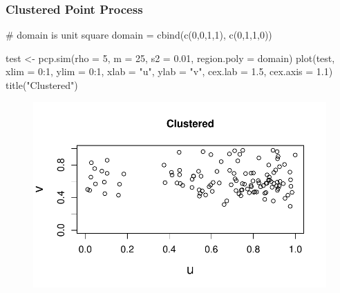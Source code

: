 \documentclass[
  letterpaper,
  DIV=11,
  numbers=noendperiod]{scrartcl}
\newenvironment{Shaded}{\begin{snugshade}}{\end{snugshade}}
\newcommand{\AttributeTok}[1]{\textcolor[rgb]{0.40,0.45,0.13}{#1}}
\newcommand{\CommentTok}[1]{\textcolor[rgb]{0.37,0.37,0.37}{#1}}
\newcommand{\DecValTok}[1]{\textcolor[rgb]{0.68,0.00,0.00}{#1}}
\newcommand{\FloatTok}[1]{\textcolor[rgb]{0.68,0.00,0.00}{#1}}
\newcommand{\FunctionTok}[1]{\textcolor[rgb]{0.28,0.35,0.67}{#1}}
\newcommand{\NormalTok}[1]{\textcolor[rgb]{0.00,0.23,0.31}{#1}}
\newcommand{\OtherTok}[1]{\textcolor[rgb]{0.00,0.23,0.31}{#1}}
\newcommand{\SpecialCharTok}[1]{\textcolor[rgb]{0.37,0.37,0.37}{#1}}
\newcommand{\StringTok}[1]{\textcolor[rgb]{0.13,0.47,0.30}{#1}}
\begin{document}
\hypertarget{clustered-point-process}{%
\subsubsection{Clustered Point Process}\label{clustered-point-process}}

\begin{Shaded}
\begin{Highlighting}[]
\CommentTok{\# domain is unit square}
\NormalTok{domain }\OtherTok{=} \FunctionTok{cbind}\NormalTok{(}\FunctionTok{c}\NormalTok{(}\DecValTok{0}\NormalTok{,}\DecValTok{0}\NormalTok{,}\DecValTok{1}\NormalTok{,}\DecValTok{1}\NormalTok{), }\FunctionTok{c}\NormalTok{(}\DecValTok{0}\NormalTok{,}\DecValTok{1}\NormalTok{,}\DecValTok{1}\NormalTok{,}\DecValTok{0}\NormalTok{))}


\NormalTok{test }\OtherTok{\textless{}{-}} \FunctionTok{pcp.sim}\NormalTok{(}\AttributeTok{rho =} \DecValTok{5}\NormalTok{, }\AttributeTok{m =} \DecValTok{25}\NormalTok{, }\AttributeTok{s2 =} \FloatTok{0.01}\NormalTok{, }\AttributeTok{region.poly =}\NormalTok{ domain)}
\FunctionTok{plot}\NormalTok{(test, }\AttributeTok{xlim =} \DecValTok{0}\SpecialCharTok{:}\DecValTok{1}\NormalTok{, }\AttributeTok{ylim =} \DecValTok{0}\SpecialCharTok{:}\DecValTok{1}\NormalTok{, }\AttributeTok{xlab =} \StringTok{"u"}\NormalTok{, }\AttributeTok{ylab =} \StringTok{"v"}\NormalTok{, }
     \AttributeTok{cex.lab =} \FloatTok{1.5}\NormalTok{, }\AttributeTok{cex.axis =} \FloatTok{1.1}\NormalTok{)}
\FunctionTok{title}\NormalTok{(}\StringTok{"Clustered"}\NormalTok{)}
\end{Highlighting}
\end{Shaded}

\begin{figure}[H]

{\centering \includegraphics{robby_homework1_files/figure-pdf/unnamed-chunk-3-1.pdf}

}

\end{figure}
\end{document}
